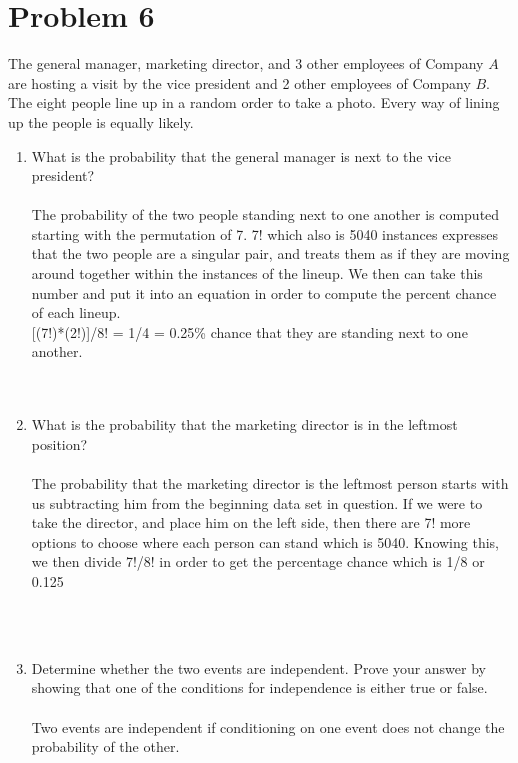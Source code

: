   \section*{Problem 6}
The general manager, marketing director, and 3 other employees of Company $A$ are hosting a visit by the vice president and 2 other employees of Company $B$. The eight people line up in a random order to take a photo. Every way of lining up the people is equally likely.
\begin{enumerate}[label=(\alph*)]
  \item What is the probability that the general manager is next to the vice president?
\\\\
 
 The probability of the two people standing next to one another is computed starting with the permutation of 7. 7! which also is 5040 instances expresses that the two people are a singular pair, and treats them as if they are moving around together within the instances of the lineup. We then can take this number and put it into an equation in order to compute the percent chance of each lineup. \\
 
 [(7!)*(2!)]/8! = 1/4 = 0.25\% chance that they are standing next to one another. \\

  
\\\\
  \item What is the probability that the marketing director is in the leftmost position?
\\\\
  The probability that the marketing director is the leftmost person starts with us subtracting him from the beginning data set in question. If we were to take the director, and place him on the left side, then there are 7! more options to choose where each person can stand which is 5040. Knowing this, we then divide 7!/8! in order to get the percentage chance which is 1/8 or 0.125%
  
\\\\
  \item Determine whether the two events are independent. Prove your answer by showing that one of the conditions for independence is either true or false.
 \\\\
  Two events are independent if conditioning on one event does not change the probability of the other. \\
  

\end{enumerate}
